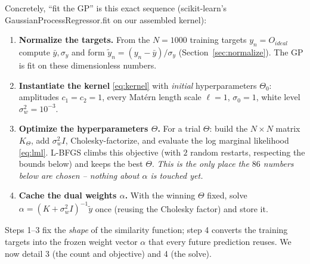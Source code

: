 \documentclass[11pt]{article}
\def\bm#1{#1}%
\def\texttt#1{#1}%
\def\mathrm#1{#1}%
\begin{document}
Concretely, ``fit the GP'' is this exact sequence
(scikit-learn's \texttt{GaussianProcessRegressor.fit} on our assembled kernel):
\begin{enumerate}
  \item \textbf{Normalize the targets.} From the $N=1000$ training targets
        $y_n=O_{\mathrm{ideal}}$ compute $\bar y,\sigma_y$ and form
        $\tilde y_n=(y_n-\bar y)/\sigma_y$ (Section~\ref{sec:normalize}). The GP is
        fit on these dimensionless numbers.
  \item \textbf{Instantiate the kernel} \eqref{eq:kernel} with \emph{initial}
        hyperparameters $\bm\Theta_0$: amplitudes $c_1{=}c_2{=}1$, every Mat\'ern
        length scale $\ell{=}1$, $\sigma_0{=}1$, white level
        $\sigma_w^2{=}10^{-3}$.
  \item \textbf{Optimize the hyperparameters $\bm\Theta$.} For a trial $\bm\Theta$:
        build the $N\times N$ matrix $K_{\bm\Theta}$, add $\sigma_w^2 I$,
        Cholesky-factorize, and evaluate the log marginal likelihood
        \eqref{eq:lml}. L-BFGS climbs this objective (with $2$ random restarts,
        respecting the bounds below) and keeps the best $\bm\Theta$. \emph{This is
        the only place the $86$ numbers below are chosen -- nothing about
        $\bm\alpha$ is touched yet.}
  \item \textbf{Cache the dual weights $\bm\alpha$.} With the winning $\bm\Theta$
        fixed, solve $\bm\alpha=(K+\sigma_w^2 I)^{-1}\tilde{\bm y}$ once (reusing
        the Cholesky factor) and store it.
\end{enumerate}
Steps 1--3 fix the \emph{shape} of the similarity function; step 4 converts the
training targets into the frozen weight vector $\bm\alpha$ that every future
prediction reuses. We now detail 3 (the count and objective) and 4 (the solve).
\end{document}
